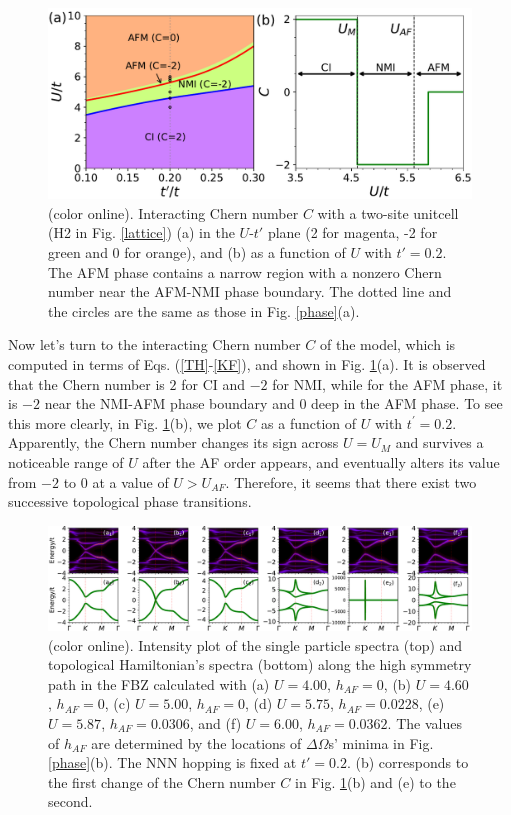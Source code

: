 \documentclass[12pt]{iopart}
\begin{document}
\begin{figure}
\centering
\includegraphics[scale=0.6]{h2chernnumber}
\caption{(color online). Interacting Chern number $C$ with a two-site unitcell (H2 in Fig. \ref{lattice}) (a) in the $U$-$t'$ plane (2 for magenta, -2 for green and 0 for orange), and (b) as a function of $U$ with $t'=0.2$. The AFM phase contains a narrow region with a nonzero Chern number near the AFM-NMI phase boundary. The dotted line and the circles are the same as those in Fig. \ref{phase}(a).}\label{h2chernnumber}
\end{figure}

\par Now let's turn to the interacting Chern number $C$ of the model, which is computed in terms of Eqs. (\ref{TH}-\ref{KF}), and shown in Fig. \ref{h2chernnumber}(a). It is observed that the Chern number is $2$ for CI and $-2$ for NMI, while for the AFM phase, it is $-2$ near the NMI-AFM phase boundary and $0$ deep in the AFM phase. To see this more clearly, in Fig. \ref{h2chernnumber}(b), we plot $C$ as a function of $U$ with $t^\prime=0.2$. Apparently, the Chern number changes its sign across $U=U_M$ and survives a noticeable range of $U$ after the AF order appears, and eventually alters its value from $-2$ to $0$ at a value of $U>U_{AF}$. Therefore, it seems that there exist two successive topological phase transitions.

\begin{figure}
\centering
\includegraphics[scale=0.45]{h2spectra}
\caption{(color online). Intensity plot of the single particle spectra (top) and topological Hamiltonian's spectra (bottom) along the high symmetry path in the FBZ calculated with (a) $U=4.00$, $h_{AF}=0$, (b) $U=4.60$, $h_{AF}=0$, (c) $U=5.00$, $h_{AF}=0$, (d) $U=5.75$, $h_{AF}=0.0228$, (e) $U=5.87$, $h_{AF}=0.0306$, and (f) $U=6.00$, $h_{AF}=0.0362$. The values of $h_{AF}$ are determined by the locations of $\Delta\Omega$s' minima in Fig. \ref{phase}(b). The NNN hopping is fixed at $t'=0.2$. (b) corresponds to the first change of the Chern number $C$ in Fig. \ref{h2chernnumber}(b) and (e) to the second.}\label{h2spectra}
\end{figure}
\end{document}
